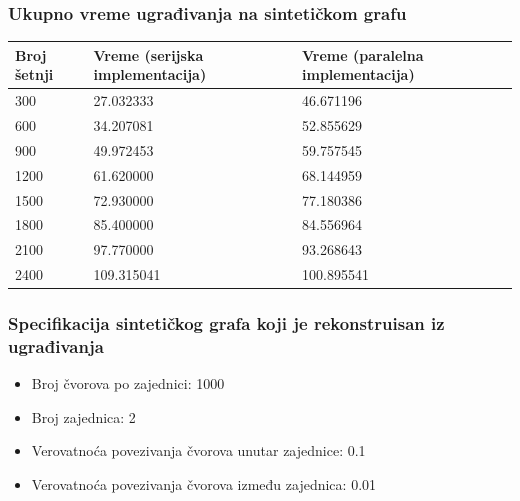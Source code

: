 \documentclass{beamer}
\begin{document}
\begin{frame}
    \frametitle{Ukupno vreme ugrađivanja na sintetičkom grafu}
    \centering
    \begin{table}
        \label{tab:4.13}
        \begin{tabular}{p{1in}p{1in}p{1in}}
            \hline
            Broj šetnji & Vreme (serijska implementacija) & Vreme (paralelna implementacija) \\
            \hline
        300 & 27.032333 & 46.671196 \\
        600 & 34.207081 & 52.855629 \\
        900 & 49.972453 & 59.757545 \\
        1200 & 61.620000 & 68.144959 \\
        1500 & 72.930000 & 77.180386 \\
        1800 & 85.400000 & 84.556964 \\
        2100 & 97.770000 & 93.268643 \\
        2400 & 109.315041 & 100.895541 \\
        \hline
    \end{tabular}
\end{table}
\end{frame}

\begin{frame}
    \frametitle{Specifikacija sintetičkog grafa koji je rekonstruisan iz ugrađivanja}
    \begin{itemize}
        \item Broj čvorova po zajednici: 1000
        \item Broj zajednica: 2
        \item Verovatnoća povezivanja čvorova unutar zajednice: 0.1
        \item Verovatnoća povezivanja čvorova između zajednica: 0.01
    \end{itemize}
\end{frame}
\end{document}
